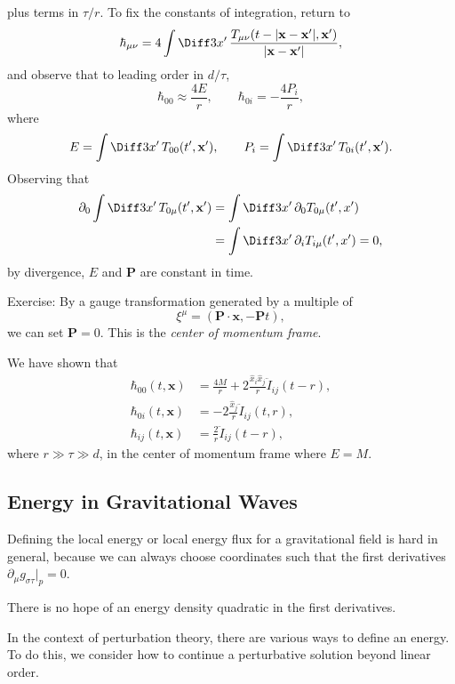 \documentclass[12pt]{article}
\begin{document}
plus terms in $\tau/r$. To fix the constants of integration, return to
\[
\hbar_{\mu\nu} = 4 \int \Diff 3 x' \, \frac{T_{\mu\nu}(t - |\mathbf{x} - \mathbf{x}'|, \mathbf{x}')}{|\mathbf{x} - \mathbf{x}'|},
\]
and observe that to leading order in $d/\tau$,
\[
\hbar_{00} \approx \frac{4E}{r}, \qquad \hbar_{0i} = - \frac{4P_i}{r},
\]
where
\[
E = \int \Diff 3 x'\, T_{00}(t', \mathbf{x}'), \qquad P_i = \int \Diff 3 x' \, T_{0i} (t', \mathbf{x}').
\]
Observing that
\begin{align*}
	\partial_0 \int \Diff 3 x' \, T_{0\mu}(t', \mathbf{x}') &= \int \Diff 3 x' \, \partial_0 T_{0\mu} (t', x') \\
								&= \int \Diff 3 x'\, \partial_i T_{i\mu}(t', x') = 0,
\end{align*}
by divergence, $E$ and $\mathbf{P}$ are constant in time.

Exercise: By a gauge transformation generated by a multiple of
\[
\xi^\mu = (\mathbf{P} \cdot \mathbf{x}, - \mathbf{P} t),
\]
we can set $\mathbf{P} = 0$. This is the \emph{center of momentum frame}.

We have shown that
\begin{align*}
	\hbar_{00}(t, \mathbf{x}) &= \frac{4M}{r} + 2 \frac{\hat x_i \hat x_j}{r} \ddot I_{ij}(t - r), \\
	\hbar_{0i}(t, \mathbf{x}) &= - 2 \frac{\hat x_j}{r} \ddot I_{ij}(t, r), \\
	\hbar_{ij}(t, \mathbf{x}) &= \frac 2r \ddot I_{ij}(t - r),
\end{align*}
where $r \gg \tau \gg d$, in the center of momentum frame where $E = M$.


\subsection{Energy in Gravitational Waves}%
\label{sub:egw}

Defining the local energy or local energy flux for a gravitational field is hard in general, because we can always choose coordinates such that the first derivatives $\partial_\mu g_{\sigma\tau}|_p = 0$.

There is no hope of an energy density quadratic in the first derivatives.

In the context of perturbation theory, there are various ways to define an energy. To do this, we consider how to continue a perturbative solution beyond linear order.
\end{document}
